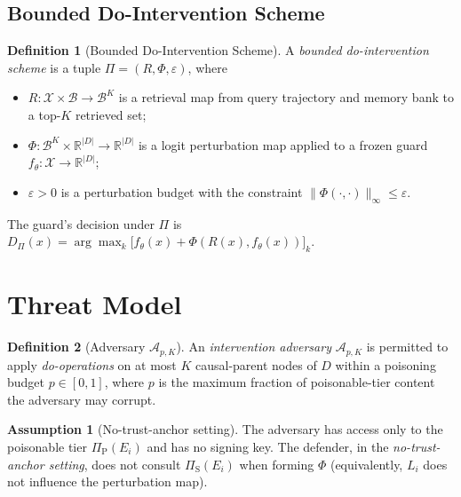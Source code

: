 \documentclass[11pt]{article}
\theoremstyle{plain}
\theoremstyle{definition}
\newtheorem{definition}{Definition}
\newtheorem{assumption}{Assumption}
\begin{document}
\subsection{Bounded Do-Intervention Scheme}

\begin{definition}[Bounded Do-Intervention Scheme]\label{def:bdis}
A \emph{bounded do-intervention scheme} is a tuple
$\Pi = (R, \Phi, \varepsilon)$, where
\begin{itemize}[noitemsep]
  \item $R: \mathcal{X} \times \mathcal{B} \to \mathcal{B}^K$ is a retrieval map
        from query trajectory and memory bank to a top-$K$ retrieved set;
  \item $\Phi: \mathcal{B}^K \times \mathbb{R}^{|D|} \to \mathbb{R}^{|D|}$
        is a logit perturbation map applied to a frozen guard
        $f_\theta: \mathcal{X} \to \mathbb{R}^{|D|}$;
  \item $\varepsilon > 0$ is a perturbation budget with the constraint
        $\|\Phi(\cdot,\cdot)\|_\infty \le \varepsilon$.
\end{itemize}
The guard's decision under $\Pi$ is
$D_\Pi(x) = \arg\max_k \bigl[f_\theta(x) + \Phi(R(x), f_\theta(x))\bigr]_k$.
\end{definition}

\section{Threat Model}\label{sec:threat}

\begin{definition}[Adversary $\mathcal{A}_{p, K}$]\label{def:adversary}
An \emph{intervention adversary} $\mathcal{A}_{p, K}$ is permitted to apply
\emph{do-operations} on at most $K$ causal-parent nodes of $D$
within a poisoning budget $p \in [0,1]$, where $p$ is the maximum fraction
of poisonable-tier content the adversary may corrupt.
\end{definition}

\begin{assumption}[No-trust-anchor setting]\label{ass:notrust}
The adversary has access only to the poisonable tier $\Pi_{\mathrm{P}}(E_i)$
and has no signing key. The defender, in the \emph{no-trust-anchor setting},
does not consult $\Pi_{\mathrm{S}}(E_i)$ when forming $\Phi$
(equivalently, $L_i$ does not influence the perturbation map).
\end{assumption}
\end{document}
